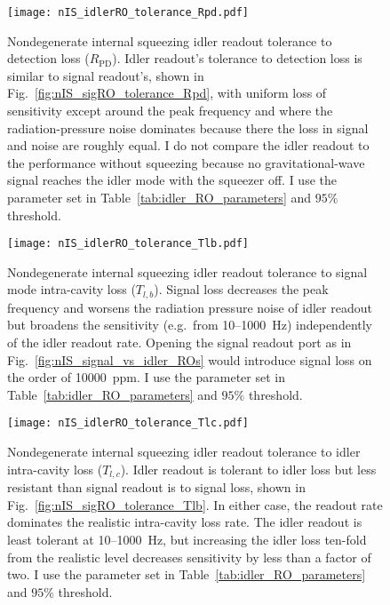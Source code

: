 \begin{figure}
    \centering
    \texttt{[image: nIS\_idlerRO\_tolerance\_Rpd.pdf]} 
    \caption{Nondegenerate internal squeezing idler readout tolerance to detection loss ($R_\text{PD}$). Idler readout's tolerance to detection loss is similar to signal readout's, shown in Fig.~\ref{fig:nIS_sigRO_tolerance_Rpd}, with uniform loss of sensitivity except around the peak frequency and where the radiation-pressure noise dominates because there the loss in signal and noise are roughly equal. I do not compare the idler readout to the performance without squeezing because no gravitational-wave signal reaches the idler mode with the squeezer off. I use the parameter set in Table~\ref{tab:idler_RO_parameters} and $95\%$ threshold.}
    \label{fig:nIS_idlerRO_tolerance_Rpd}
\end{figure}
\begin{figure}
	\centering
	\texttt{[image: nIS\_idlerRO\_tolerance\_Tlb.pdf]}
	\caption{ Nondegenerate internal squeezing idler readout tolerance to signal mode intra-cavity loss ($T_{l,b}$). Signal loss decreases the peak frequency and worsens the radiation pressure noise of idler readout but broadens the sensitivity (e.g.\ from 10--1000~Hz) independently of the idler readout rate. Opening the signal readout port as in Fig.~\ref{fig:nIS_signal_vs_idler_ROs} would introduce signal loss on the order of 10000~ppm. I use the parameter set in Table~\ref{tab:idler_RO_parameters} and $95\%$ threshold.}
	\label{fig:nIS_idlerRO_tolerance_Tlb}
\end{figure}
\begin{figure}[t]
	\centering
	\texttt{[image: nIS\_idlerRO\_tolerance\_Tlc.pdf]}
	\caption{ Nondegenerate internal squeezing idler readout tolerance to idler intra-cavity loss ($T_{l,c}$). Idler readout is tolerant to idler loss but less resistant than signal readout is to signal loss, shown in Fig.~\ref{fig:nIS_sigRO_tolerance_Tlb}. In either case, the readout rate dominates the realistic intra-cavity loss rate. The idler readout is least tolerant at 10--1000~Hz, but increasing the idler loss ten-fold from the realistic level decreases sensitivity by less than a factor of two. %
    I use the parameter set in Table~\ref{tab:idler_RO_parameters} and $95\%$ threshold.}
	\label{fig:nIS_idlerRO_tolerance_Tlc}
\end{figure}

